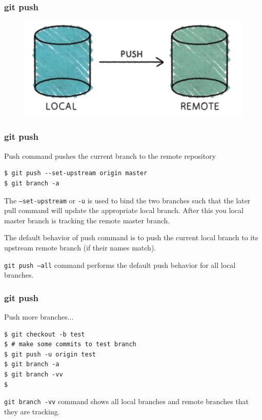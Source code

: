 \documentclass{beamer}
\begin{document}
\begin{frame}[fragile]
\frametitle{git push}
\begin{figure}

  \includegraphics[scale=0.3]{figures/f6.png}
\end{figure}
\end{frame}


\begin{frame}[fragile]
\frametitle{git push}

Push command pushes the current branch to the remote repository

\begin{lstlisting}
$ git push --set-upstream origin master 
$ git branch -a
\end{lstlisting}

The \texttt{---set-upstream} or \texttt{-u} is used to bind the two
branches such that the later pull command will update the appropriate
local branch. After this you local master branch is tracking the
remote master branch.

The default behavior of push command is to push the current local
branch to its upstream remote branch (if their names match).

\texttt{git push ---all} command performs the default push behavior
for all local branches.


\end{frame}


\begin{frame}[fragile]
\frametitle{git push}

Push more branches...

\begin{lstlisting}
$ git checkout -b test
$ # make some commits to test branch
$ git push -u origin test 
$ git branch -a
$ git branch -vv
$ 
\end{lstlisting}

\texttt{git branch -vv} command shows all local branches and remote
branches that they are tracking.

\end{frame}
\end{document}
